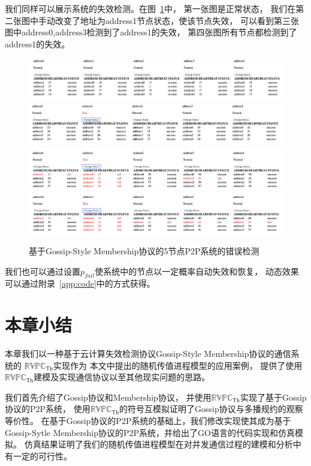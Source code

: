 我们同样可以展示系统的失效检测。在图~\ref{fig:demo_2}中，
第一张图是正常状态，
我们在第二张图中手动改变了地址为address1节点状态，使该节点失效，
可以看到第三张图中address0,address3检测到了address1的失效，
第四张图所有节点都检测到了address1的失效。
 \begin{figure}[!htp]
   \begin{minipage}{0.9\textwidth}
     \centering
     \includegraphics[width=15cm]{../figures/demo/0.png}
     \\
     \includegraphics[width=15cm]{../figures/demo/1.png}
     \\
     \includegraphics[width=15cm]{../figures/demo/2.png}
     \\
     \includegraphics[width=15cm]{../figures/demo/3.png}
   \end{minipage}
   \caption{基于Gossip-Style Membership协议的5节点P2P系统的错误检测}
   \label{fig:demo_2}   
\end{figure}

我们也可以通过设置$p_{fail}$使系统中的节点以一定概率自动失效和恢复，
动态效果可以通过附录~\ref{app:code}中的方式获得。

 \section{本章小结}
 本章我们以一种基于云计算失效检测协议Gossip-Style Membership协议的通信系统的
 $\mathbb{RVPC}_{\mathsf{Th}}$实现作为
 本文中提出的随机传值进程模型的应用案例，
 提供了使用$\mathbb{RVPC}_{\mathsf{Th}}$建模及实现通信协议以至其他现实问题的思路。

 我们首先介绍了Gossip协议和Membership协议，
并使用$\mathbb{RVPC}_{\mathsf{Th}}$实现了基于Gossip协议的P2P系统，
使用$\mathbb{RVPC}_{\mathsf{Th}}$的符号互模拟证明了Gossip协议与多播规约的观察等价性。
在基于Gossip协议的P2P系统的基础上，我们修改实现使其成为基于
Gossip-Sytle Membership协议的P2P系统，并给出了GO语言的代码实现和仿真模拟。
仿真结果证明了我们的随机传值进程模型在对并发通信过程的建模和分析中有一定的可行性。
